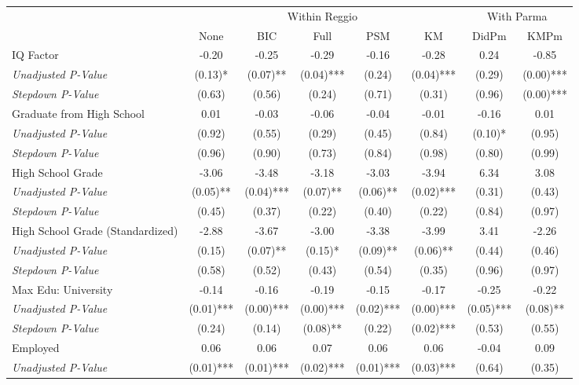 \begin{tabular}{l c c c c c c c}
\toprule
& \multicolumn{5}{c}{Within Reggio} & \multicolumn{2}{c}{With Parma}  \\\cmidrule(lr){2-6} \cmidrule(lr){7-8}
 & None & BIC & Full & PSM & KM & DidPm & KMPm \\
\midrule
IQ Factor & -0.20 & -0.25 & -0.29 & -0.16 & -0.28 & 0.24 & -0.85 \\
\quad \textit{Unadjusted P-Value} & (0.13)* & (0.07)** & (0.04)*** & (0.24) & (0.04)*** & (0.29) & (0.00)*** \\
\quad \textit{Stepdown P-Value} & (0.63) & (0.56) & (0.24) & (0.71) & (0.31) & (0.96) & (0.00)*** \\
Graduate from High School & 0.01 & -0.03 & -0.06 & -0.04 & -0.01 & -0.16 & 0.01 \\
\quad \textit{Unadjusted P-Value} & (0.92) & (0.55) & (0.29) & (0.45) & (0.84) & (0.10)* & (0.95) \\
\quad \textit{Stepdown P-Value} & (0.96) & (0.90) & (0.73) & (0.84) & (0.98) & (0.80) & (0.99) \\
High School Grade & -3.06 & -3.48 & -3.18 & -3.03 & -3.94 & 6.34 & 3.08 \\
\quad \textit{Unadjusted P-Value} & (0.05)** & (0.04)*** & (0.07)** & (0.06)** & (0.02)*** & (0.31) & (0.43) \\
\quad \textit{Stepdown P-Value} & (0.45) & (0.37) & (0.22) & (0.40) & (0.22) & (0.84) & (0.97) \\
High School Grade (Standardized) & -2.88 & -3.67 & -3.00 & -3.38 & -3.99 & 3.41 & -2.26 \\
\quad \textit{Unadjusted P-Value} & (0.15) & (0.07)** & (0.15)* & (0.09)** & (0.06)** & (0.44) & (0.46) \\
\quad \textit{Stepdown P-Value} & (0.58) & (0.52) & (0.43) & (0.54) & (0.35) & (0.96) & (0.97) \\
Max Edu: University & -0.14 & -0.16 & -0.19 & -0.15 & -0.17 & -0.25 & -0.22 \\
\quad \textit{Unadjusted P-Value} & (0.01)*** & (0.00)*** & (0.00)*** & (0.02)*** & (0.00)*** & (0.05)*** & (0.08)** \\
\quad \textit{Stepdown P-Value} & (0.24) & (0.14) & (0.08)** & (0.22) & (0.02)*** & (0.53) & (0.55) \\
Employed & 0.06 & 0.06 & 0.07 & 0.06 & 0.06 & -0.04 & 0.09 \\
\quad \textit{Unadjusted P-Value} & (0.01)*** & (0.01)*** & (0.02)*** & (0.01)*** & (0.03)*** & (0.64) & (0.35) \\

\end{tabular}
